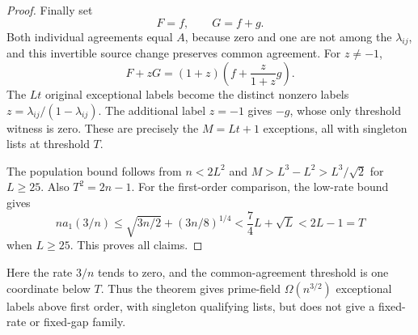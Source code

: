 \begin{proof}
Finally set
\[
 F=f,\qquad G=f+g.
\]
Both individual agreements equal $A$, because zero and one are not
among the $\lambda_{ij}$, and this invertible source change preserves
common agreement. For $z\ne-1$,
\[
 F+zG=(1+z)\left(f+\frac{z}{1+z}g\right).
\]
The $Lt$ original exceptional labels become the distinct nonzero labels
$z=\lambda_{ij}/(1-\lambda_{ij})$. The additional label $z=-1$ gives
$-g$, whose only threshold witness is zero. These are precisely the
$M=Lt+1$ exceptions, all with singleton lists at threshold $T$.

The population bound follows from $n<2L^2$ and
$M>L^3-L^2> L^3/\sqrt2$ for $L\ge25$.
Also $T^2=2n-1$. For the first-order comparison, the low-rate bound gives
\[
 na_1(3/n)\le\sqrt{3n/2}+(3n/8)^{1/4}
 <\frac74L+\sqrt L<2L-1=T
\]
when $L\ge25$. This proves all claims.
\end{proof}

Here the rate $3/n$ tends to zero, and the common-agreement threshold
is one coordinate below $T$. Thus the theorem gives prime-field
$\Omega(n^{3/2})$ exceptional labels above first order, with singleton
qualifying lists, but does not give a fixed-rate or fixed-gap family.
